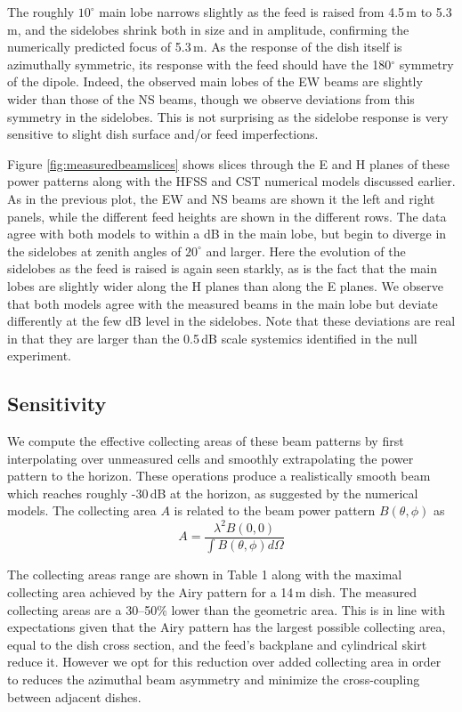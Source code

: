\documentclass{emulateapj}
\begin{document}
The roughly $10^\circ$ main lobe narrows slightly as the feed is raised from 4.5\,m to 5.3\,m, and the sidelobes shrink both in size and in amplitude, confirming the numerically predicted focus of 5.3\,m. As the response of the dish itself is azimuthally symmetric, its response with the feed should have the 180$^\circ$ symmetry of the dipole. Indeed, the observed main lobes of the EW beams are slightly wider than those of the NS beams, though we observe deviations from this symmetry in the sidelobes. This is not surprising as the sidelobe response is very sensitive to slight dish surface and/or feed imperfections.

Figure \ref{fig:measuredbeamslices} shows slices through the E and H planes of these power patterns along with the HFSS and CST numerical models discussed earlier. As in the previous plot, the EW and NS beams are shown it the left and right panels, while the different feed heights are shown in the different rows. The data agree with both models to within a dB in the main lobe, but begin to diverge in the sidelobes at zenith angles of $20^\circ$ and larger. Here the evolution of the sidelobes as the feed is raised is again seen starkly, as is the fact that the main lobes are slightly wider along the H planes than along the E planes. We observe that both models agree with the measured beams in the main lobe but deviate differently at the few dB level in the sidelobes. Note that these deviations are real in that they are larger than the 0.5\,dB scale systemics identified in the null experiment. 

\subsection{Sensitivity}

We compute the effective collecting areas of these beam patterns by first interpolating over unmeasured cells and smoothly extrapolating the power pattern to the horizon. These operations produce a realistically smooth beam which reaches roughly -30\,dB at the horizon, as suggested by the numerical models. The collecting area $A$ is related to the beam power pattern $B(\theta,\phi)$ as
\begin{equation}
	A=\frac{\lambda^2 B(0,0)}{\int B(\theta,\phi)d\Omega}
\end{equation}

The collecting areas range are shown in Table 1 along with the maximal collecting area achieved by the Airy pattern for a 14\,m dish. The measured collecting areas are a 30--50\% lower than the geometric area. This is in line with expectations given that the Airy pattern has the largest possible collecting area, equal to the dish cross section, and the feed's backplane and cylindrical skirt reduce it. However we opt for this reduction over added collecting area in order to reduces the azimuthal beam asymmetry and minimize the cross-coupling between adjacent dishes.
\end{document}
